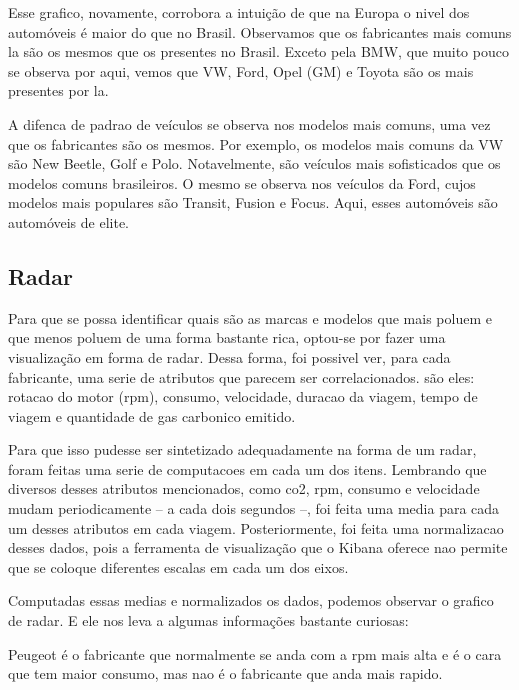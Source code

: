 \documentclass[10pt, conference]{IEEEtran}
\begin{document}
Esse grafico, novamente, corrobora a intuição de que na Europa o nivel dos automóveis é maior do que no Brasil.
Observamos que os fabricantes mais comuns la são os mesmos que os presentes no Brasil. Exceto pela BMW, que
muito pouco se observa por aqui, vemos que VW, Ford, Opel (GM) e Toyota são os mais presentes por la.

A difenca de padrao de veículos se observa nos modelos mais comuns, uma vez que os fabricantes são os mesmos.
Por exemplo, os modelos mais comuns da VW são New Beetle, Golf e Polo. Notavelmente, são veículos mais
sofisticados que os modelos comuns brasileiros. O mesmo se observa nos veículos da Ford, cujos modelos
mais populares são Transit, Fusion e Focus. Aqui, esses automóveis são automóveis de elite.





\subsection{Radar}

Para que se possa identificar quais são as marcas e modelos que mais poluem e que menos poluem
de uma forma bastante rica, optou-se por fazer uma visualização em forma de radar. Dessa forma,
foi possivel ver, para cada fabricante, uma serie de atributos que parecem ser correlacionados.
são eles: rotacao do motor (rpm), consumo, velocidade, duracao da viagem, tempo de viagem e 
quantidade de gas carbonico emitido. 

Para que isso pudesse ser sintetizado adequadamente na forma de um radar, foram feitas uma serie
de computacoes em cada um dos itens. Lembrando que diversos desses atributos mencionados, como
co2, rpm, consumo e velocidade mudam periodicamente -- a cada dois segundos --, foi feita uma media
para cada um desses atributos em cada viagem. Posteriormente, foi feita uma normalizacao desses dados,
pois a ferramenta de visualização que o Kibana oferece nao permite que se coloque diferentes escalas
em cada um dos eixos.

Computadas essas medias e normalizados os dados, podemos observar o grafico de radar. E ele nos leva
a algumas informações bastante curiosas:

Peugeot é o fabricante que normalmente se anda com a rpm mais alta e é o cara que tem maior consumo, 
mas nao é o fabricante que anda mais rapido. 
\end{document}
